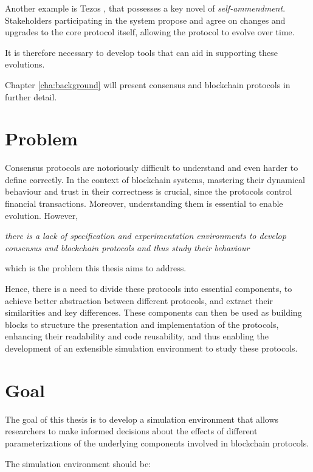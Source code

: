 Another example is Tezos \cite{tezos}, that possesses a key novel of \textit{self-ammendment}. Stakeholders participating in the system propose and agree on changes and upgrades to the core protocol itself, allowing the protocol to evolve over time. 

It is therefore necessary to develop tools that can aid in supporting these evolutions.

Chapter \ref{cha:background} will present consensus and blockchain protocols in further detail.


\section{Problem}

Consensus protocols are notoriously difficult to understand and even harder to define correctly. In the context of blockchain systems, mastering their dynamical behaviour and trust in their correctness is crucial, since the protocols control financial transactions. Moreover, understanding them is essential to enable evolution. However,

\begin{center}
  \emph{there is a lack of specification and experimentation environments to develop consensus and blockchain protocols and thus study their behaviour}
\end{center}

\noindent which is the problem this thesis aims to address.

Hence, there is a need to divide these protocols into essential components, to achieve better abstraction between different protocols, and extract their similarities and key differences. These components can then be used as building blocks to structure the presentation and implementation of the protocols, enhancing their readability and code reusability, and thus enabling the development of an extensible simulation environment to study these protocols.

\section{Goal}

The goal of this thesis is to develop a simulation environment that allows researchers to make informed decisions about the effects of different parameterizations of the underlying components involved in blockchain protocols.

The simulation environment should be:

